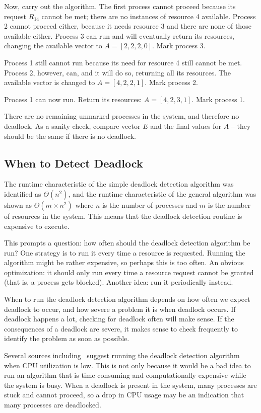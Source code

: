 \documentclass[a4paper]{report}
\begin{document}
Now, carry out the algorithm. The first process cannot proceed because its request $R_{14}$ cannot be met; there are no instances of resource 4 available. Process 2 cannot proceed either, because it needs resource 3 and there are none of those available either. Process 3 can run and will eventually return its resources, changing the available vector to $A = [2, 2, 2, 0]$. Mark process 3.

Process 1 still cannot run because its need for resource 4 still cannot be met. Process 2, however, can, and it will do so, returning all its resources. The available vector is changed to $A = [4, 2, 2, 1]$. Mark process 2.

Process 1 can now run. Return its resources: $A = [4, 2, 3, 1]$. Mark process 1.

There are no remaining unmarked processes in the system, and therefore no deadlock. As a sanity check, compare vector $E$ and the final values for $A$ -- they should be the same if there is no deadlock.


\subsection*{When to Detect Deadlock}
The runtime characteristic of the simple deadlock detection algorithm was identified as $\Theta(n^{2})$, and the runtime characteristic of the general algorithm was shown as $\Theta(m \times n^{2})$ where $n$ is the number of processes and $m$ is the number of resources in the system. This means that the deadlock detection routine is expensive to execute.

This prompts a question: how often should the deadlock detection algorithm be run? One strategy is to run it every time a resource is requested. Running the algorithm might be rather expensive, so perhaps this is too often. An obvious optimization: it should only run every time a resource request cannot be granted (that is, a process gets blocked). Another idea: run it periodically instead.

When to run the deadlock detection algorithm depends on how often we expect deadlock to occur, and how severe a problem it is when deadlock occurs. If deadlock happens a lot, checking for deadlock often will make sense. If the consequences of a deadlock are severe, it makes sense to check frequently to identify the problem as soon as possible.

Several sources including~\cite{mos} suggest running the deadlock detection algorithm when CPU utilization is low. This is not only because it would be a bad idea to run an algorithm that is time consuming and computationally expensive while the system is busy. When a deadlock is present in the system, many processes are stuck and cannot proceed, so a drop in CPU usage may be an indication that many processes are deadlocked.
\end{document}

